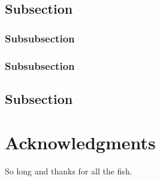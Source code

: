 \documentclass[fleqn,10pt,lineno]{wlpeerj}
\begin{document}
	\lipsum[10] %
	
	\subsection*{Subsection}
	
	\lipsum[11] %
	
	\subsubsection*{Subsubsection}
	
	\lipsum[12] %
	
	\subsubsection*{Subsubsection}
	
	\lipsum[14] %
	
	\subsection*{Subsection}
	
	\lipsum[15-20] %
	
	\section*{Acknowledgments}
	
	So long and thanks for all the fish.
	
	
	
\end{document}
